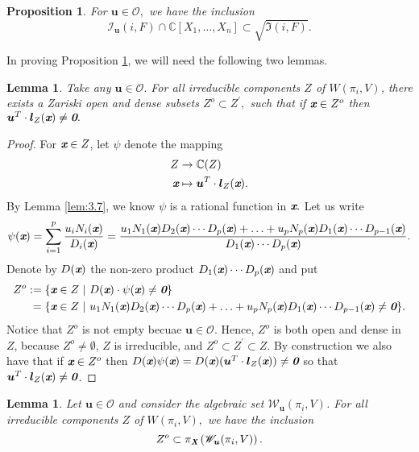 \documentclass[a4paper]{article}
\def\sO{\mathscr{O}}
\def\bz{\textit{\textbf{0}}}
\def\Xb{\textit{\textbf{X}}}
\def\ub{{\bm u}}
\def\lb{{\bm l}}
\def\xb{\textit{\textbf{x}}}
\def\C{\mathbb{C}}
\def\Wi{W(\pi_i,V)}
\def\Iir{\sqrt{\mathfrak{I}(i,F)}}
\def\Iil{\mathscr{I}_{\ub}(i,F)}
\def\Wil{\mathscr{W}_{\ub}(\pi_i,V)}
\newtheorem{lemma}[theorem]{Lemma}
\newtheorem{prop}[theorem]{Proposition}
\begin{document}
\begin{prop}\label{prop:polarVs1}
For $\ub \in \mathscr{O},$ we have the inclusion 
\[
\Iil \cap \C[X_1,\hdots,X_n] \subset \Iir.
\]
\end{prop}
%
%
\noindent 
In proving Proposition \ref{prop:polarVs1}, we will need the following two lemmas.
\begin{lemma}\label{lem:3.8}
Take any $\ub \in \mathscr{O}.$ For all irreducible components $Z$ of $\Wi$, there exists a Zariski open and dense subsets $Z^o \subset Z^{'},$ such that if  $\xb \in Z^o$ then $\ub^T\cdot \lb_{Z}(\xb) \not = \bz.$ 
\end{lemma}
%
\begin{proof}
For $\xb \in Z$, let $\psi$ denote the mapping 
\begin{align*}
Z  &\rightarrow \C(Z)\\    
    \xb &\mapsto \ub^T \cdot \lb_{Z}(\xb).    
\end{align*}
 By Lemma \ref{lem:3.7}, we know $\psi$ is a rational function in $\xb.$ Let us write 
\[
\psi(\xb) = \sum_{i=1}^p\frac{u_iN_{i}(\xb)}{D_{i}(\xb)}
= \frac{u_1N_1(\xb)D_2(\xb)\cdots D_p(\xb) + \hdots + u_pN_p(\xb)D_1(\xb)\cdots D_{p-1}(\xb)}{D_1(\xb) \cdots D_p(\xb)}
. 
\]
Denote by $D(\xb)$ the non-zero product $D_1(\xb) \cdots D_p(\xb)$ and put  
\begin{align*}
Z^o := \{\xb \in Z~&|~D(\xb)\cdot \psi(\xb) \not = \bz\} \\
= \{\xb \in Z~&|~u_1N_1(\xb)D_2(\xb)\cdots D_p(\xb) + \hdots + u_pN_p(\xb)D_1(\xb)\cdots D_{p-1}(\xb) \not = \bz\}.
\end{align*}
Notice that $Z^{o}$ is not empty becuae $\ub \in \sO.$ Hence, $Z^o$ is both open and dense in $Z$, because $Z^o \not = \emptyset$, $Z$ is irreducible, and $Z^o \subset Z^{'} \subset Z$. By construction we also have that if $\xb \in Z^o$ then $D({\xb})\psi(\xb) = D({\xb})(\ub^T \cdot \lb_Z(\xb))\not = \bz$ so that $\ub^T \cdot \lb_{Z}(\xb)\not = \bz$.
\end{proof}
%
\begin{lemma}\label{lem:3.9}
Let $\ub \in \mathscr{O}$ and consider the algebraic set $\Wil$. For all irreducible components $Z$ of $\Wi,$ we have the inclusion \[Z^o \subset \pi_{\Xb}\left(\Wil\right).\]
\end{lemma}
\end{document}
